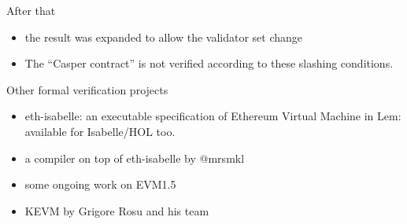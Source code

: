 \documentclass{beamer}
\begin{document}
\begin{frame}{After that}
  \begin{itemize}
  \item the result was expanded to allow the validator set change
  \item The ``Casper contract'' is not verified according to these slashing conditions.
  \end{itemize}
\end{frame}

\begin{frame}{Other formal verification projects}
\begin{itemize}
\item eth-isabelle: an executable specification of Ethereum Virtual Machine in Lem: available for Isabelle/HOL too.
\item a compiler on top of eth-isabelle by @mrsmkl
\item some ongoing work on EVM1.5
\item KEVM by Grigore Rosu and his team
\end{itemize}
\end{frame}
\end{document}
